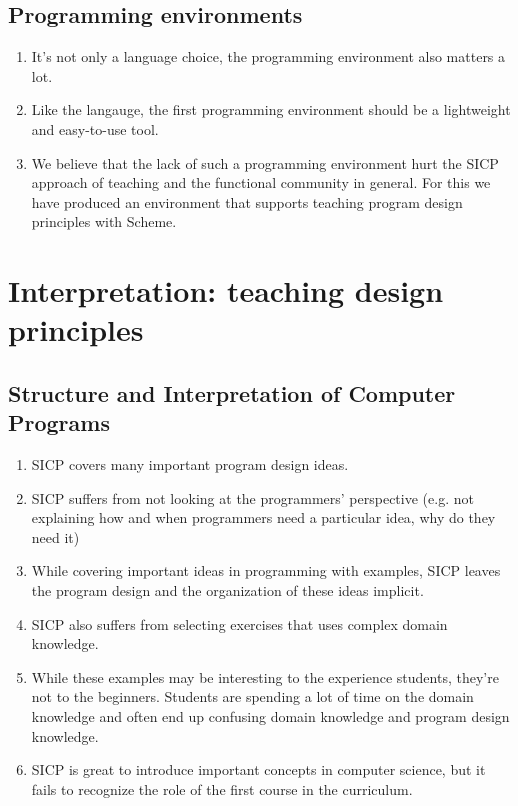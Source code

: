 \documentclass{article}
\begin{document}
\subsection{Programming environments}

\begin{enumerate}
\item It's not only a language choice, the programming environment
  also matters a lot.
\item Like the langauge, the first programming environment should be
  a lightweight and easy-to-use tool.
\item We believe that the lack of such a programming environment hurt
  the SICP approach of teaching and the functional community in
  general. For this we have produced an environment that supports
  teaching program design principles with Scheme.
\end{enumerate}

\section{Interpretation: teaching design principles}

\subsection{Structure and Interpretation of Computer Programs}

\begin{enumerate}
\item SICP covers many important program design ideas.
\item SICP suffers from not looking at the programmers' perspective
  (e.g. not explaining how and when programmers need a particular
  idea, why do they need it)
\item While covering important ideas in programming with examples,
  SICP leaves the program design and the organization of these ideas
  implicit.
\item SICP also suffers from selecting exercises that uses complex
  domain knowledge.
\item While these examples may be interesting to the experience
  students, they're not to the beginners. Students are spending a lot
  of time on the domain knowledge and often end up confusing domain
  knowledge and program design knowledge.
\item SICP is great to introduce important concepts in computer
  science, but it fails to recognize the role of the first course in
  the curriculum.
\end{enumerate}
\end{document}
